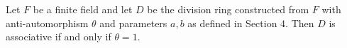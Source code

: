 Let $F$ be a finite field and let $D$ be the division ring constructed from $F$ with anti-automorphism $\theta$ and parameters $a, b$ as defined in Section 4. Then $D$ is associative if and only if $\theta = 1$.
